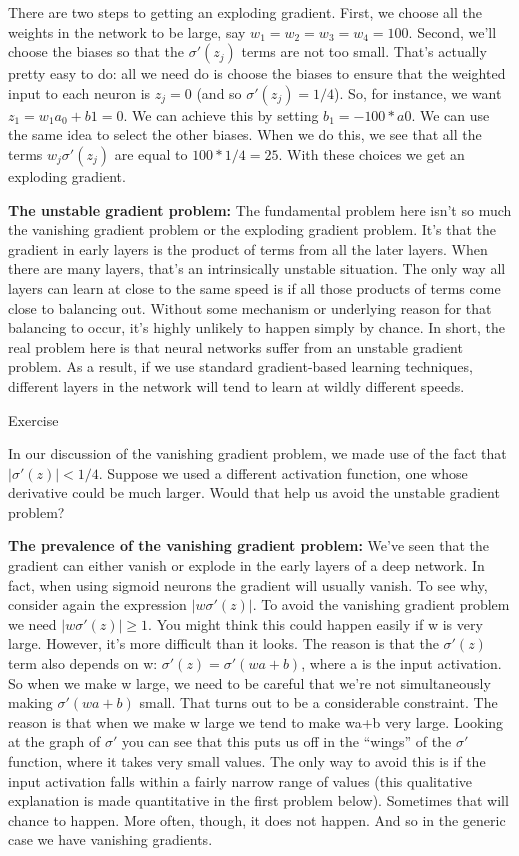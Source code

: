 \documentclass[a4paper,twoside,10pt]{book}
\begin{document}
There are two steps to getting an exploding gradient. First, we choose all the weights in the network to be large, say $w_1=w_2=w_3=w_4=100$. Second, we'll choose the biases so that the $\sigma'(z_j)$ terms are not too small. That's actually pretty easy to do: all we need do is choose the biases to ensure that the weighted input to each neuron is $z_j=0$ (and so $\sigma'(z_j)=1/4$). So, for instance, we want $z_1=w_1a_0+b1=0$. We can achieve this by setting $b_1=−100\ast a0$. We can use the same idea to select the other biases. When we do this, we see that all the terms $w_j\sigma'(z_j)$ are equal to $100\ast1/4=25$. With these choices we get an exploding gradient.

\textbf{The unstable gradient problem:} The fundamental problem here isn't so much the vanishing gradient problem or the exploding gradient problem. It's that the gradient in early layers is the product of terms from all the later layers. When there are many layers, that's an intrinsically unstable situation. The only way all layers can learn at close to the same speed is if all those products of terms come close to balancing out. Without some mechanism or underlying reason for that balancing to occur, it's highly unlikely to happen simply by chance. In short, the real problem here is that neural networks suffer from an unstable gradient problem. As a result, if we use standard gradient-based learning techniques, different layers in the network will tend to learn at wildly different speeds.

\begin{exercize}{Exercise}
\item In our discussion of the vanishing gradient problem, we made use of the fact that $|\sigma'(z)|<1/4$. Suppose we used a different activation function, one whose derivative could be much larger. Would that help us avoid the unstable gradient problem?
\end{exercize}
\textbf{The prevalence of the vanishing gradient problem:} We've seen that the gradient can either vanish or explode in the early layers of a deep network. In fact, when using sigmoid neurons the gradient will usually vanish. To see why, consider again the expression $|w\sigma'(z)|$. To avoid the vanishing gradient problem we need $|w\sigma'(z)|\geq1$. You might think this could happen easily if w is very large. However, it's more difficult than it looks. The reason is that the $\sigma'(z)$ term also depends on w: $\sigma'(z)=\sigma'(wa+b)$, where a is the input activation. So when we make w large, we need to be careful that we're not simultaneously making $\sigma'(wa+b)$ small. That turns out to be a considerable constraint. The reason is that when we make w large we tend to make wa+b very large. Looking at the graph of $\sigma'$ you can see that this puts us off in the ``wings'' of the $\sigma'$ function, where it takes very small values. The only way to avoid this is if the input activation falls within a fairly narrow range of values (this qualitative explanation is made quantitative in the first problem below). Sometimes that will chance to happen. More often, though, it does not happen. And so in the generic case we have vanishing gradients.
\end{document}
